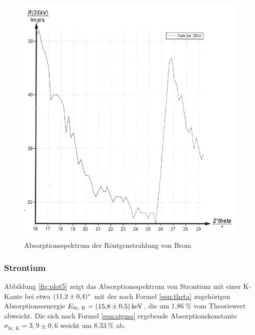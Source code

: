 \begin{figure}[H]
  \centering
  \includegraphics[scale=0.3]{content/bild6.png}
  \caption{Absorptionsspektrum der Röntgenstrahlung von Brom}
  \label{fig:plot4}
\end{figure}

\subsubsection{Strontium}

Abbildung \ref{fig:plot5} zeigt das Absorptionsspektrum von Strontium mit einer 
K-Kante bei etwa $\SI{11.2 +- 0.4}{\degree}$ mit der nach Formel \eqref{eqn:theta}
zugehörigen Absorptionssenergie $ E_\text{Sr, K} = \SI{15.8 +- 0.5}{\kilo\eV}$,
die um $\SI{1.86}{\percent}$ vom Theoriewert abweicht. Die sich nach Formel 
\eqref{eqn:sigma} ergebende Absorptionskonstante $\sigma_\text{Sr, K} = 3,9 \pm 0,6$
weicht um $\SI{8.33}{\percent}$ ab.

